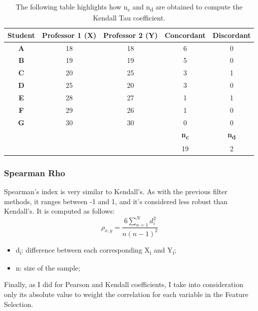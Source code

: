 \begin{table}[H]
\begin{center}
\begin{tabular}{|c| c| c| c |c|} 
\hline
 \textbf{Student} & \textbf{Professor 1 (X)} & \textbf{Professor 2 (Y)} & \textbf{Concordant} & \textbf{Discordant}\\ 
 \hline
 \textbf{A} & 18 & 18 & 6 &0 \\ 
 \hline
 \textbf{B} & 19 & 19 & 5 &0\\
 \hline
 \textbf{C} & 20 & 25 & 3 &1\\
 \hline
 \textbf{D} & 25 & 20 & 3 &0\\
 \hline
 \textbf{E} & 28 & 27 & 1 &1\\ 
 \hline
  \textbf{F} & 29 & 26 & 1& 0 \\  
 \hline
  \textbf{G} & 30 & 30 & 0& 0 \\ 
  \hline
 \hline
    &  &  & \textbf{n\textsubscript{c}} & \textbf{n\textsubscript{d}}\\ 
 \hline
     &  & & 19 & 2\\  
 \hline
\end{tabular}
\end{center}
\caption{The following table highlights how n\textsubscript{c} and n\textsubscript{d} are obtained to compute the Kendall Tau coefficient.}
\label{tab:kendall}
\end{table}





\subsubsection{Spearman Rho}
Spearman’s index is very similar to Kendall’s. As with the previous filter methods, it ranges between -1 and 1, and it's considered less robust than Kendall's.
It is computed as follows:
\begin{equation}
\rho_{x,y} = \frac{6\sum_{n=1}^{N} d_i^2}{n(n-1)^2}
\end{equation}
\begin{itemize}
\item d\textsubscript{i}: difference between each corresponding X\textsubscript{i} and Y\textsubscript{i};
\item n: size of the sample;
\end{itemize}

Finally, as I did for Pearson and Kendall coefficients, I take into consideration only its absolute value to weight the correlation for each variable in the Feature Selection.


